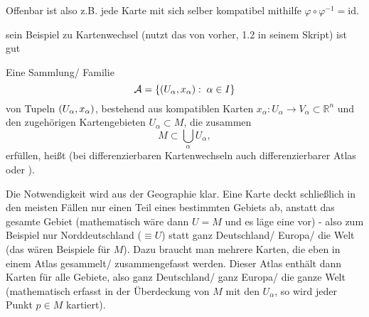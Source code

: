 \documentclass[../H_Analysis_main.tex]{subfiles}
\begin{document}
Offenbar ist also z.B. jede Karte mit sich selber kompatibel mithilfe $\varphi \circ \varphi^{-1} = \text{id}$.

\begin{bsp}
sein Beispiel zu Kartenwechsel (nutzt das von vorher, 1.2 in seinem Skript) ist gut
\end{bsp}

\begin{defi}[Atlas]
Eine Sammlung/ Familie
\begin{equation}
\mathcal{A} = \qty{\qty(U_\alpha, x_\alpha): \; \alpha \in I}
\end{equation}
von Tupeln $\qty(U_\alpha, x_\alpha)$, bestehend aus kompatiblen Karten $x_\alpha: U_\alpha \rightarrow V_\alpha \subset \mathbb{R}^n$ und den zugehörigen Kartengebieten $U_\alpha \subset M$, die zusammen
\begin{equation}
M \subset \bigcup_\alpha U_\alpha ,
\end{equation}
erfüllen, heißt  (bei differenzierbaren Kartenwechseln auch differenzierbarer Atlas oder ).
\end{defi}

Die Notwendigkeit wird aus der Geographie klar. Eine Karte deckt schließlich in den meisten Fällen nur einen Teil eines bestimmten Gebiets ab, anstatt das gesamte Gebiet (mathematisch wäre dann $U = M$ und es läge eine  vor) - also zum Beispiel nur Norddeutschland ($\equiv U$) statt ganz Deutschland/ Europa/ die Welt (das wären Beispiele für $M$). Dazu braucht man mehrere Karten, die eben in einem Atlas gesammelt/ zusammengefasst werden. Dieser Atlas enthält dann Karten für alle Gebiete, also ganz Deutschland/ ganz Europa/ die ganze Welt (mathematisch erfasst in der Überdeckung von $M$ mit den $U_\alpha$, so wird jeder Punkt $p \in M$ kartiert).
\end{document}
